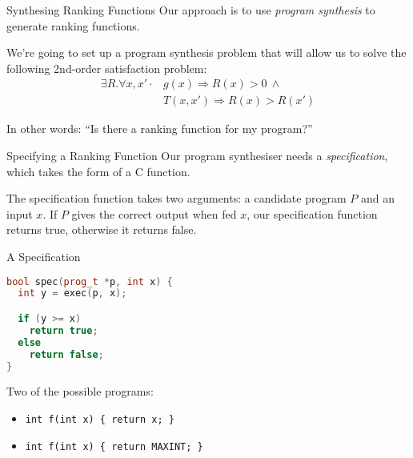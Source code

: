 \documentclass[xcolor=pdftex,t,11pt]{beamer}
\begin{document}
\begin{frame}{Synthesing Ranking Functions}
Our approach is to use \emph{program synthesis} to generate ranking functions.

\vspace{1em}

We're going to set up a program synthesis problem that will allow us to solve
the following 2nd-order satisfaction problem:
\begin{align*}
 \exists R . \forall x, x' \cdot & g(x) \Rightarrow R(x) > 0 ~ \wedge \\
                             & T(x, x') \Rightarrow R(x) > R(x')
\end{align*}

\pause

\vspace{1em}

In other words: ``Is there a ranking function for my program?''

\end{frame}

\begin{frame}{Specifying a Ranking Function}
Our program synthesiser needs a \emph{specification}, which takes the form of a C function.

\vspace{1em}

The specification function takes two arguments: a candidate program $P$ and an input $x$.
If $P$ gives the correct output when fed $x$, our specification function returns true,
otherwise it returns false.
\end{frame}

\begin{frame}[fragile]{A Specification}

\vspace{-1em}

\begin{center}
\begin{minipage}{.6\textwidth}
\begin{lstlisting}[language=C++,basicstyle=\small]
bool spec(prog_t *p, int x) {
  int y = exec(p, x);

  if (y >= x)
    return true;
  else
    return false;
}
\end{lstlisting}
\end{minipage}
\end{center}

\pause

Two of the possible programs:

\begin{itemize}
  \item[] \texttt{int f(int x) \{ return x; \}} 
  \item[] \texttt{int f(int x) \{ return MAXINT; \}}
\end{itemize}

\end{frame}
\end{document}
